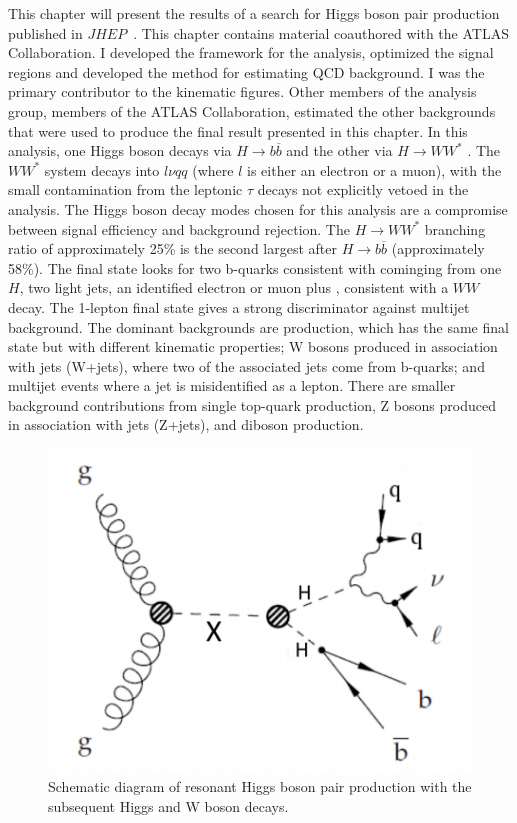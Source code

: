This chapter will present the results of a search for Higgs boson pair production published in $JHEP$~\cite{Aaboud:2018zhh}. This chapter contains material coauthored with the ATLAS Collaboration. I developed the framework for the analysis, optimized the signal regions and developed the method for estimating QCD background. I was the primary contributor to the kinematic figures. Other members of the analysis group, members of the ATLAS Collaboration, estimated the other backgrounds that were used to produce the final result presented in this chapter. In this analysis, one Higgs boson decays via ${H\rightarrow b\overline{b}}$ and the other via ${H\rightarrow WW^{*}}$ . The ${WW^{*}}$ system decays into ${l\nu qq}$ (where ${l}$ is either an electron or a muon), with the small contamination from the leptonic ${\tau}$ decays not explicitly vetoed in the analysis. The Higgs boson decay modes chosen for this analysis are a compromise between signal efficiency and background rejection. The ${H\rightarrow WW^{*}}$ branching ratio of approximately 25\% is the second largest after ${H\rightarrow b\overline{b}}$ (approximately 58\%). The final state looks for two b-quarks consistent with cominging from one $H$, two light jets, an identified electron or muon plus \met{}, consistent with a $WW$ decay. The 1-lepton final state gives a strong discriminator against multijet background. The dominant backgrounds are \ttbar{} production, which has the same final state but with different kinematic properties; W bosons produced in association with jets (W+jets), where two of the associated jets come from b-quarks; and multijet events where a jet is misidentified as a lepton. There are smaller background contributions from single top-quark production, Z bosons produced in association with jets (Z+jets), and diboson production.\newline

\begin{figure}[h]
\begin{center}
\includegraphics[scale=0.65]{figures/res_prod}
\caption[Schematic diagram of ${HH\rightarrow b\bar{b}WW^{*}\rightarrow b\bar{b}l\nu qq}$]{Schematic diagram of resonant Higgs boson pair production with the subsequent Higgs and W boson
decays.}
\label{fig:res}
\end{center}
\end{figure}


